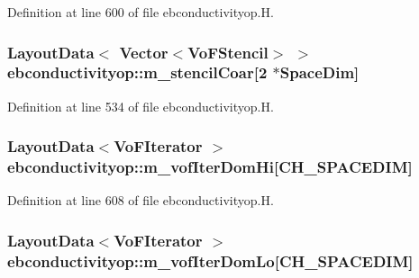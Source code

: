 Definition at line 600 of file ebconductivityop.\+H.

\subsubsection[{\texorpdfstring{m\+\_\+stencil\+Coar}{m_stencilCoar}}]{\setlength{\rightskip}{0pt plus 5cm}Layout\+Data$<$ Vector$<$Vo\+F\+Stencil$>$ $>$ ebconductivityop\+::m\+\_\+stencil\+Coar\mbox{[}2 $\ast$Space\+Dim\mbox{]}\hspace{0.3cm}{\ttfamily [protected]}}\hypertarget{classebconductivityop_a134afe9874f31c76449d311f2a81a486}{}\label{classebconductivityop_a134afe9874f31c76449d311f2a81a486}


Definition at line 534 of file ebconductivityop.\+H.

\subsubsection[{\texorpdfstring{m\+\_\+vof\+Iter\+Dom\+Hi}{m_vofIterDomHi}}]{\setlength{\rightskip}{0pt plus 5cm}Layout\+Data$<$Vo\+F\+Iterator $>$ ebconductivityop\+::m\+\_\+vof\+Iter\+Dom\+Hi\mbox{[}C\+H\+\_\+\+S\+P\+A\+C\+E\+D\+IM\mbox{]}\hspace{0.3cm}{\ttfamily [protected]}}\hypertarget{classebconductivityop_a4ffec1cfb6a6fd836405e169c8a10a7c}{}\label{classebconductivityop_a4ffec1cfb6a6fd836405e169c8a10a7c}


Definition at line 608 of file ebconductivityop.\+H.

\subsubsection[{\texorpdfstring{m\+\_\+vof\+Iter\+Dom\+Lo}{m_vofIterDomLo}}]{\setlength{\rightskip}{0pt plus 5cm}Layout\+Data$<$Vo\+F\+Iterator $>$ ebconductivityop\+::m\+\_\+vof\+Iter\+Dom\+Lo\mbox{[}C\+H\+\_\+\+S\+P\+A\+C\+E\+D\+IM\mbox{]}\hspace{0.3cm}{\ttfamily [protected]}}\hypertarget{classebconductivityop_a431522b2bd75c2e1e5e292ce736819d4}{}\label{classebconductivityop_a431522b2bd75c2e1e5e292ce736819d4}


